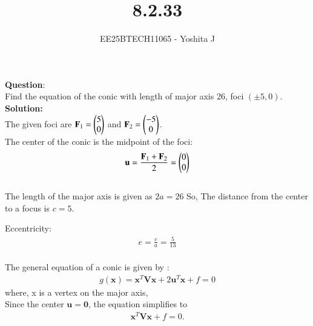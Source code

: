 \documentclass[journal]{IEEEtran}
\begin{document}

\vspace{3cm}

\title{8.2.33}
\author{EE25BTECH11065 - Yoshita J}
{\let\newpage\relax\maketitle}

\renewcommand{\thefigure}{\theenumi}
\renewcommand{\thetable}{\theenumi}
\setlength{\intextsep}{10pt} %

\textbf{Question}:\\
Find the equation of the conic with length of major axis 26, foci $(\pm 5, 0)$.
\\

\textbf{Solution:} \\
The given foci are $\mathbf{F}_1 = \begin{pmatrix}5 \\ 0\end{pmatrix}$ and $\mathbf{F}_2 = \begin{pmatrix}-5 \\ 0\end{pmatrix}$.
\\

The center of the conic is the midpoint of the foci:
\begin{align}
    \mathbf{u} = \frac{\mathbf{F}_1 + \mathbf{F}_2}{2} = \begin{pmatrix}0 \\ 0\end{pmatrix}
\end{align}
\\

The length of the major axis is given as $2a = 26$
So, The distance from the center to a focus is $c=5$.

Eccentricity:
\begin{align}
    e = \frac{c}{a} = \frac{5}{13}
\end{align}
\\


The general equation of a conic is given by :
\begin{align}
    g(\mathbf{x}) = \mathbf{x}^T\mathbf{V}\mathbf{x} + 2\mathbf{u}^T\mathbf{x} + f = 0
\end{align}
where, x is a vertex on the major axis, 
\\


Since the center $\mathbf{u}=\mathbf{0}$, the equation simplifies to
\begin{align}
\mathbf{x}^T\mathbf{V}\mathbf{x} + f = 0.
\end{align}
\\
\end{document}

